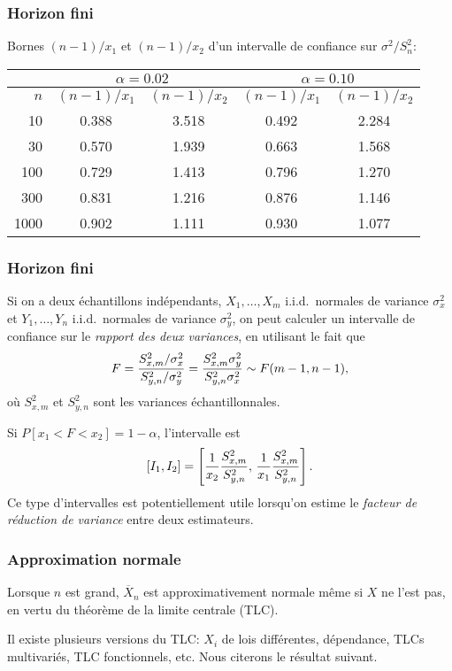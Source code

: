 \documentclass[t,usepdftitle=false]{beamer}
\def\iid{i.i.d.}
\begin{document}
\begin{frame}
\frametitle{Horizon fini}

Bornes $(n-1)/x_1$ et $(n-1)/x_2$ d'un intervalle de confiance sur $\sigma^2/S_n^2$:
\begin{tabular}{|r|cc|cc|}
\hline
 & \multicolumn{2}{c|}{${\alpha=0.02}$} & \multicolumn{2}{c|}{${\alpha=0.10}$} \\
\hline 
  ${n}$  & $(n-1)/x_1$ & $(n-1)/x_2$ & $(n-1)/x_1$ & $(n-1)/x_2$ \\
\hline
 10 &      0.388 &      3.518
    &      0.492 &      2.284 \\
 30 &      0.570 &      1.939 
    &      0.663 &      1.568 \\
100 &      0.729 &      1.413 
    &      0.796 &      1.270 \\
300 &      0.831 &      1.216 
    &      0.876 &      1.146 \\
1000&      0.902 &      1.111
    &      0.930 &      1.077 \\
\hline
\end{tabular}

\end{frame}

\begin{frame}
\frametitle{Horizon fini}

Si on a deux échantillons indépendants, $X_1,\dots,X_m$ 
\iid\ normales de variance ${\sigma_x^2}$ 
et $Y_1,\dots,Y_n$ \iid\ normales de variance ${\sigma_y^2}$,
on peut calculer un intervalle de confiance sur le
\emph{rapport des deux variances}, en utilisant le fait que 
$$
  {F} = {S_{x,m}^2 / \sigma_x^2 \over S_{y,n}^2/\sigma_y^2 }
    = {S_{x,m}^2 \sigma_y^2 \over S_{y,n}^2 \sigma_x^2 }
    \sim F(m-1,n-1),
$$
où ${S_{x,m}^2}$ et ${S_{y,n}^2}$ sont les variances 
échantillonnales.

\mbox{}

Si $P[x_1 < F < x_2] = 1-\alpha$, l'intervalle est
\[
  [I_1, I_2] = \left[{1\over x_2}{S_{x,m}^2 \over S_{y,n}^2},\, 
                     {1\over x_1}{S_{x,m}^2 \over S_{y,n}^2}\right]. 
\]
Ce type d'intervalles est potentiellement utile lorsqu'on estime le 
\emph{facteur de réduction de variance} entre deux estimateurs.

\end{frame}

\begin{frame}
\frametitle{Approximation normale}

Lorsque $n$ est grand, $\overline{X}_n$ est approximativement normale même si
$X$ ne l'est pas, en vertu du théorème de la limite centrale (TLC).

\mbox{}

Il existe plusieurs versions du TLC: $X_i$ de lois différentes, dépendance,
TLCs multivariés, TLC fonctionnels, etc.
Nous citerons le résultat suivant.

\end{frame}
\end{document}
